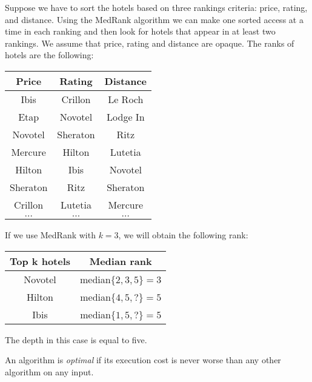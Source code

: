 \begin{example}
    Suppose we have to sort the hotels based on three rankings criteria: price, rating, and distance. Using the MedRank algorithm we can make one sorted access at a time in 
    each ranking and then look for hotels that appear in at least two rankings. We assume that price, rating and distance are opaque. The 
    ranks of hotels are the following:
    \begin{table}[H]
        \centering
        \begin{tabular}{c|c|c}
        \textbf{Price} & \textbf{Rating} & \textbf{Distance} \\ \hline
        Ibis           & Crillon         & Le Roch           \\
        Etap           & Novotel         & Lodge In          \\
        Novotel        & Sheraton        & Ritz              \\
        Mercure        & Hilton          & Lutetia           \\
        Hilton         & Ibis            & Novotel           \\
        Sheraton       & Ritz            & Sheraton          \\
        Crillon        & Lutetia         & Mercure           \\
        $\dots$        & $\dots$         & $\dots$          
        \end{tabular}
    \end{table}
    If we use MedRank with $k=3$, we will obtain the following rank: 
    \begin{table}[H]
        \centering
        \begin{tabular}{cc}
        \hline
        \textbf{Top k hotels}       & \textbf{Median rank}          \\ \hline
        Novotel                     & median$\{2,3,5\}=3$           \\ 
        Hilton                      & median$\{4,5,?\}=5$           \\ 
        Ibis                        & median$\{1,5,?\}=5$           \\ \hline
        \end{tabular}
    \end{table}
    The depth in this case is equal to five. 
\end{example}
\begin{definition}
    An algorithm is \emph{optimal} if its execution cost is never worse than any other algorithm on any input.
\end{definition}
